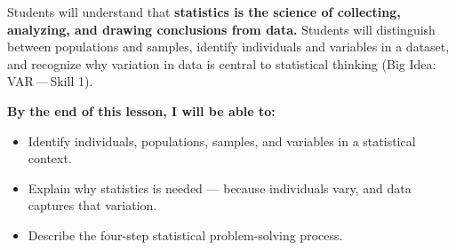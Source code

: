 \documentclass[aspectratio=169, 11pt]{beamer}
\begin{document}
{
\begin{frame}[t, plain]
  \vspace{0.45cm}\par
  \hspace{0.55cm}%
  \begin{minipage}{0.9\textwidth}


    \normalsize
    Students will understand that \textbf{statistics is the science of
    collecting, analyzing, and drawing conclusions from data.}
    Students will distinguish between populations and samples,
    identify individuals and variables in a dataset, and recognize
    why variation in data is central to statistical thinking
    (Big Idea: VAR\,---\,Skill 1).

    \vspace{0.6cm}

    \normalsize\textbf{\color{navy}By the end of this lesson, I will be able to:}

    \smallskip
    \begin{itemize}
      \setlength{\itemsep}{0.3em}\setlength{\topsep}{0.2em}
      \item Identify individuals, populations, samples, and variables in a
        statistical context.
      \item Explain why statistics is needed --- because individuals vary,
        and data captures that variation.
      \item Describe the four-step statistical problem-solving process.
    \end{itemize}

  \end{minipage}
\end{frame}
}
\end{document}
